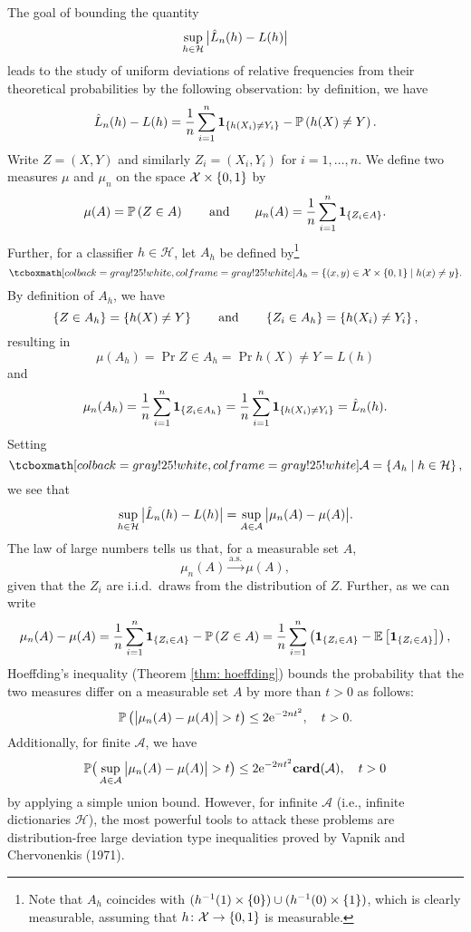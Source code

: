 The goal of bounding the quantity
\[
    \sup_{h \in \mathcal{H}} \big\lvert \hat L_n(h) - L(h) \big\rvert
\]
leads to the study of uniform deviations of relative frequencies from their theoretical probabilities by the following observation: by definition, we have
\[
    \hat L_n(h) - L(h) = \frac{1}{n} \sum_{i=1}^n \mathbf{1}_{\left\{h(X_i) \neq Y_i\right\}} - \mathbb{P}\left(h(X) \neq Y\right).
\]
Write $Z = (X, Y)$ and similarly $Z_i = (X_i, Y_i)$ for $i = 1, \dots, n$. We define two measures $\mu$ and $\mu_n$ on the space $\mathcal{X} \times \left\{0, 1\right\}$ by
\[
    \mu(A) = \mathbb{P}\left(Z \in A\right) \qquad \text{and} \qquad \mu_n(A) = \frac{1}{n} \sum_{i=1}^n \mathbf{1}_{\left\{Z_i \in A\right\}}.
\]
Further, for a classifier $h \in \mathcal{H}$, let $A_h$ be defined by\footnote{Note that $A_h$ coincides with $(h^{-1}(1) \times \left\{0\right\}) \cup (h^{-1}(0) \times \left\{1\right\})$, which is clearly measurable, assuming that $h \colon \mathcal{X} \to \left\{0, 1\right\}$ is measurable.}
\begin{equation}
\label{eq: sets A_h}
    \highlightMath{
        A_h = \{ (x, y) \in \mathcal{X} \times \set{0, 1} \with h(x) \neq y \}.
    }
\end{equation}
By definition of $A_h$, we have
\[
    \left\{Z \in A_h\right\} = \left\{h(X) \neq Y\right\} \qquad \text{and} \qquad \left\{Z_i \in A_h\right\} = \left\{h(X_i) \neq Y_i\right\},
\]
resulting in
\[
    \mu(A_h) = \Pr{Z \in A_h} = \Pr{h(X) \neq Y} = L(h)
\]
and
\[
    \mu_n(A_h) = \frac{1}{n} \sum_{i=1}^n \mathbf{1}_{\left\{Z_i \in A_h\right\}} = \frac{1}{n} \sum_{i=1}^n \mathbf{1}_{\left\{h(X_i) \neq Y_i\right\}} = \hat L_n(h).
\]
Setting
\begin{equation}
\label{eq: collection of sets A_h}
    \highlightMath{
        \mathcal{A} = \set{A_h \with h \in \mathcal{H}},
    }
\end{equation}
we see that
\[
    \sup_{h \in \mathcal{H}} \big\lvert \hat L_n(h) - L(h) \big\rvert = \sup_{A \in \mathcal{A}} \big\lvert \mu_n(A) - \mu(A) \big\rvert.
\]
The law of large numbers tells us that, for a measurable set $A$,
\[
    \mu_n(A) \xrightarrow{\mathrm{a.s.}} \mu(A),
\]
given that the $Z_i$ are i.i.d.\ draws from the distribution of $Z$. Further, as we can write
\[
    \mu_n(A) - \mu(A) = \frac{1}{n} \sum_{i=1}^n \mathbf{1}_{\left\{Z_i \in A\right\}} - \mathbb{P}\left(Z \in A\right) = \frac{1}{n} \sum_{i=1}^n \left( \mathbf{1}_{\left\{Z_i \in A\right\}} - \mathbb{E}\left[\mathbf{1}_{\left\{Z_i \in A\right\}}\right] \right),
\]
Hoeffding's inequality (Theorem \ref{thm: hoeffding}) bounds the probability that the two measures differ on a measurable set $A$ by more than $t > 0$ as follows:
\[
    \mathbb{P}\left(\big\lvert \mu_n(A) - \mu(A) \big\rvert > t\right) \leq 2\mathrm{e}^{-2nt^2}, \quad t > 0.
\]
Additionally, for finite $\mathcal{A}$, we have
\[
    \mathbb{P}\big( \sup_{A \in \mathcal{A}} \big\lvert \mu_n(A) - \mu(A) \big\rvert > t \big) \leq 2\mathrm{e}^{-2nt^2} \mathrm{\mathbf{card}}(\mathcal{A}), \quad t > 0
\]
by applying a simple union bound. However, for infinite $\mathcal{A}$ (i.e., infinite dictionaries $\mathcal{H}$), the most powerful tools to attack these problems are distribution-free large deviation type inequalities proved by Vapnik and Chervonenkis (1971).

